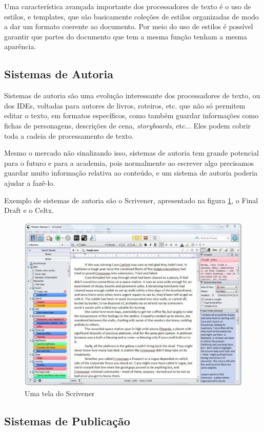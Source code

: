 Uma característica avançada importante dos processadores de texto é o uso de estilos, e templates, que são basicamente coleções de estilos organizadas de modo a dar um formato coerente ao documento. Por meio do uso de estilos é possível garantir que partes do documento que tem a mesma função tenham a mesma aparência.

\subsection{Sistemas de Autoria}

Sistemas de autoria são uma evolução interessante dos processadores de texto, ou dos IDEs, voltadas para autores de livros, roteiros, etc. que não só permitem editar o texto, em formatos específicos, como também guardar informações como fichas de personagens, descrições de cena, \textit{storyboards}, etc... Eles podem cobrir toda a cadeia de processamento de texto.

Mesmo o mercado não sinalizando isso, sistemas de autoria tem grande potencial para o futuro e para a academia, pois normalmente ao escrever algo precisamos guardar muito informação relativa ao conteúdo, e um sistema de autoria poderia ajudar a fazê-lo. 

Exemplo de sistemas de autoria são o Scrivener, apresentado na figura \ref{fig:scrivener}, o Final Draft e o Celtx.

\begin{figure}[hbt]
    \centering
    \includegraphics[width=0.7\linewidth]{Images/scrivener}
    \caption[Uma tela do Scrivener]{Uma tela do Scrivener}
    \label{fig:scrivener}
\end{figure}


\subsection{Sistemas de Publicação}


